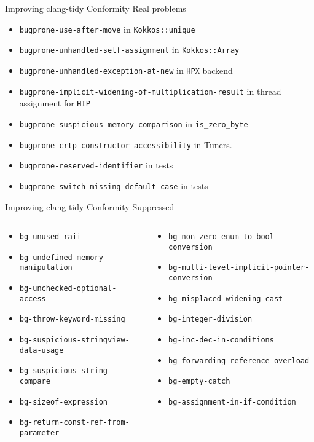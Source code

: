 \begin{frame}[fragile]{Improving clang-tidy Conformity}
Real problems
\begin{itemize}
 \item \texttt{bugprone-use-after-move} in \texttt{Kokkos::unique}
 \item \texttt{bugprone-unhandled-self-assignment} in \texttt{Kokkos::Array}
 \item \texttt{bugprone-unhandled-exception-at-new} in \texttt{HPX} backend
 \item \texttt{bugprone-implicit-widening-of-multiplication-result} in thread assignment for \texttt{HIP}
 \item \texttt{bugprone-suspicious-memory-comparison} in \texttt{is\_zero\_byte}
 \item \texttt{bugprone-crtp-constructor-accessibility} in Tuners.
 \item \texttt{bugprone-reserved-identifier} in tests
 \item \texttt{bugprone-switch-missing-default-case} in tests
\end{itemize}
\end{frame}
\begin{frame}[fragile]{Improving clang-tidy Conformity}
Suppressed
\scriptsize
\begin{columns}
\begin{column}{0.45\textwidth}
\begin{itemize}
  \item \texttt{bg-unused-raii}
  \item \texttt{bg-undefined-memory-manipulation}
  \item \texttt{bg-unchecked-optional-access}
  \item \texttt{bg-throw-keyword-missing}
  \item \texttt{bg-suspicious-stringview-data-usage}
  \item \texttt{bg-suspicious-string-compare}
  \item \texttt{bg-sizeof-expression}
  \item \texttt{bg-return-const-ref-from-parameter}
 \end{itemize}
 \end{column}
 \begin{column}{0.55\textwidth}
 \begin{itemize}
  \item \texttt{bg-non-zero-enum-to-bool-conversion}
  \item \texttt{bg-multi-level-implicit-pointer-conversion}
  \item \texttt{bg-misplaced-widening-cast}
  \item \texttt{bg-integer-division}
  \item \texttt{bg-inc-dec-in-conditions}
  \item \texttt{bg-forwarding-reference-overload}
  \item \texttt{bg-empty-catch}
  \item \texttt{bg-assignment-in-if-condition}
\end{itemize}
 \end{column}
  \end{columns}
\end{frame}

